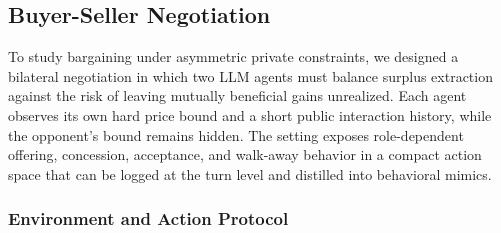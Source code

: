 %



\subsection{Buyer-Seller Negotiation}

To study bargaining under asymmetric private constraints, we designed a bilateral negotiation in which two LLM agents must balance surplus extraction against the risk of leaving mutually beneficial gains unrealized. Each agent observes its own hard price bound and a short public interaction history, while the opponent's bound remains hidden. The setting exposes role-dependent offering, concession, acceptance, and walk-away behavior in a compact action space that can be logged at the turn level and distilled into behavioral mimics.

\subsubsection{Environment and Action Protocol}

